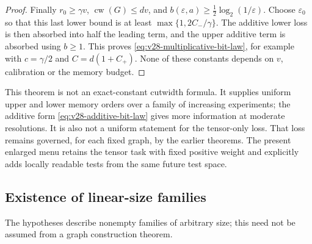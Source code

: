 \begin{proof}
Finally $r_0\ge\gamma v$, $\operatorname{cw}(G)\le dv$, and
$b(\varepsilon,a)\ge\tfrac12\log_2(1/\varepsilon)$. Choose
$\varepsilon_0$ so that this last lower bound is at least
$\max\{1,2C_-/\gamma\}$. The additive lower loss is then absorbed
into half the leading term, and the upper additive term is absorbed
using $b\ge1$. This proves \eqref{eq:v28-multiplicative-bit-law},
for example with $c=\gamma/2$ and $C=d(1+C_+)$. None of these
constants depends on $v$, calibration or the memory budget.
\end{proof}

This theorem is not an exact-constant cutwidth formula. It supplies
uniform upper and lower memory orders over a family of increasing
experiments; the additive form \eqref{eq:v28-additive-bit-law} gives
more information at moderate resolutions. It is also not a uniform
statement for the tensor-only loss. That loss remains governed, for
each fixed graph, by the earlier theorems. The present enlarged menu
retains the tensor task with fixed positive weight and explicitly
adds locally readable tests from the same future test space.

\subsection{Existence of linear-size families}
The hypotheses describe nonempty families of arbitrary size; this
need not be assumed from a graph construction theorem.


